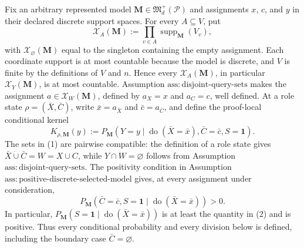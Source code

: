 Fix an arbitrary represented model \(\mathbf M\in\mathfrak M_d^+(\mathcal P)\) and assignments \(x\), \(c\), and \(y\) in their declared discrete support spaces.  For every \(A\subseteq V\), put
\[
 \mathcal X_A(\mathbf M)
 :=\prod_{v\in A}\operatorname{supp}_{\mathbf M}(V_v),
\]
with \(\mathcal X_{\varnothing}(\mathbf M)\) equal to the singleton containing the empty assignment.  Each coordinate support is at most countable because the model is discrete, and \(V\) is finite by the definitions of \(V\) and \(n\).  Hence every \(\mathcal X_A(\mathbf M)\), in particular \(\mathcal X_Y(\mathbf M)\), is at most countable.  Assumption \(\mathrm{ass{:}disjoint\text{-}query\text{-}sets}\) makes the assignment \(a\in\mathcal X_W(\mathbf M)\), defined by \(a_X=x\) and \(a_C=c\), well defined.  At a role state \(\rho=(\bar X,\bar C)\), write \(\bar x=a_{\bar X}\) and \(\bar c=a_{\bar C}\), and define the proof-local conditional kernel
\[
 K_{\rho,\mathbf M}(y)
 :=P_{\mathbf M}\!\left(
 Y=y\mid\operatorname{do}(\bar X=\bar x),
 \bar C=\bar c,S=\mathbf 1\right).
 \tag{1}
\]
The sets in (1) are pairwise compatible: the definition of a role state gives \(\bar X\mathbin{\dot\cup}\bar C=W=X\cup C\), while \(Y\cap W=\varnothing\) follows from Assumption \(\mathrm{ass{:}disjoint\text{-}query\text{-}sets}\).  The positivity condition in Assumption \(\mathrm{ass{:}positive\text{-}discrete\text{-}selected\text{-}model}\) gives, at every assignment under consideration,
\[
 P_{\mathbf M}\!\left(
 \bar C=\bar c,S=\mathbf 1
 \mid\operatorname{do}(\bar X=\bar x)\right)>0.
 \tag{2}
\]
In particular, \(P_{\mathbf M}(S=\mathbf 1\mid\operatorname{do}(\bar X=\bar x))\) is at least the quantity in (2) and is positive.  Thus every conditional probability and every division below is defined, including the boundary case \(\bar C=\varnothing\).

